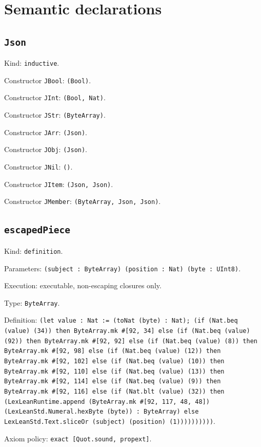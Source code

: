 \documentclass[11pt]{article}
\begin{document}
\section*{Semantic declarations}
\subsection*{\texttt{Json}}
\noindent Kind: \texttt{inductive}.\par
\noindent Constructor \texttt{JBool}: \texttt{(Bool)}.\par
\noindent Constructor \texttt{JInt}: \texttt{(Bool, Nat)}.\par
\noindent Constructor \texttt{JStr}: \texttt{(ByteArray)}.\par
\noindent Constructor \texttt{JArr}: \texttt{(Json)}.\par
\noindent Constructor \texttt{JObj}: \texttt{(Json)}.\par
\noindent Constructor \texttt{JNil}: \texttt{()}.\par
\noindent Constructor \texttt{JItem}: \texttt{(Json, Json)}.\par
\noindent Constructor \texttt{JMember}: \texttt{(ByteArray, Json, Json)}.\par
\subsection*{\texttt{escapedPiece}}
\noindent Kind: \texttt{definition}.\par
\noindent Parameters: \texttt{(subject : ByteArray) (position : Nat) (byte : UInt8)}.\par
\noindent Execution: executable, non-escaping closures only.\par
\noindent Type: \texttt{ByteArray}.\par
\noindent Definition: \texttt{(let value : Nat := (toNat (byte) : Nat); (if (Nat.beq (value) (34)) then ByteArray.mk \#[92, 34] else (if (Nat.beq (value) (92)) then ByteArray.mk \#[92, 92] else (if (Nat.beq (value) (8)) then ByteArray.mk \#[92, 98] else (if (Nat.beq (value) (12)) then ByteArray.mk \#[92, 102] else (if (Nat.beq (value) (10)) then ByteArray.mk \#[92, 110] else (if (Nat.beq (value) (13)) then ByteArray.mk \#[92, 114] else (if (Nat.beq (value) (9)) then ByteArray.mk \#[92, 116] else (if (Nat.blt (value) (32)) then (LexLeanRuntime.append (ByteArray.mk \#[92, 117, 48, 48]) (LexLeanStd.Numeral.hexByte (byte)) : ByteArray) else LexLeanStd.Text.sliceOr (subject) (position) (1))))))))))}.\par
\noindent Axiom policy: \texttt{exact [Quot.sound, propext]}.\par
\end{document}
